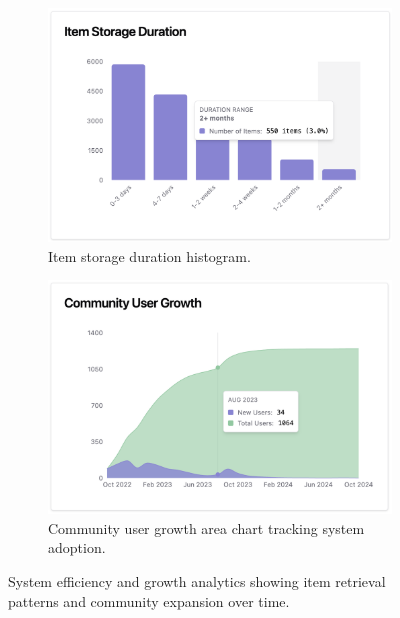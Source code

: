 \begin{figure}[h]
    \centering
    \begin{subfigure}[b]{0.49\textwidth}
        \centering
        \includegraphics[width=\textwidth]{figs/appendix/web/5A.png}
        \caption{Item storage duration histogram.}
        \label{fig:web_storage_duration}
    \end{subfigure}
    \hfill
    \begin{subfigure}[b]{0.49\textwidth}
        \centering
        \includegraphics[width=\textwidth]{figs/appendix/web/5B.png}
        \caption{Community user growth area chart tracking system adoption.}
        \label{fig:web_user_growth}
    \end{subfigure}
    \caption{System efficiency and growth analytics showing item retrieval patterns and community expansion over time.}
    \label{fig:web_system_analytics}
\end{figure}

